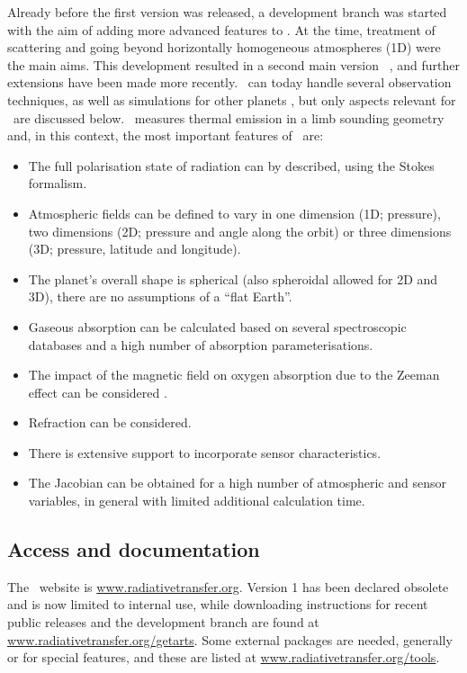 Already before the first version was released, a development branch was started
with the aim of adding more advanced features to \ARTS. At the time, treatment
of scattering and going beyond horizontally homogeneous atmospheres (1D) were
the main aims. This development resulted in a second main version \ARTS\
\citep{eriksson:arts2:11}, and further extensions have been made more recently.
\ARTS\ can today handle several observation techniques, as well as simulations
for other planets \citep{buehler:artst:18}, but only aspects relevant for \smr\
are discussed below. \smr\ measures thermal emission in a limb sounding
geometry and, in this context, the most important features of \ARTS\ are:
\begin{itemize}
\item The full polarisation state of radiation can by described, using the Stokes
  formalism.
\item Atmospheric fields can be defined to vary in one dimension (1D;
  pressure), two dimensions (2D; pressure and angle along the orbit) or three
  dimensions (3D; pressure, latitude and longitude).
\item The planet's overall shape is spherical (also spheroidal allowed for 2D
  and 3D), there are no assumptions of a ``flat Earth''.
\item Gaseous absorption can be calculated based on several spectroscopic
  databases and a high number of absorption parameterisations.
\item The impact of the magnetic field on oxygen absorption due to the Zeeman
  effect can be considered \citep{larsson:zeema:14}.
\item Refraction can be considered.
\item There is extensive support to incorporate sensor characteristics.
\item The Jacobian can be obtained for a high number of atmospheric and sensor
  variables, in general with limited additional calculation time.
\end{itemize}



\subsection{Access and documentation}
%
The \ARTS\ website is \url{www.radiativetransfer.org}. Version 1
has been declared obsolete and is now limited to internal use, while downloading
instructions for recent public releases and the development branch are found
at \url{www.radiativetransfer.org/getarts}. Some external packages are needed,
generally or for special features, and these are listed at
\url{www.radiativetransfer.org/tools}.

